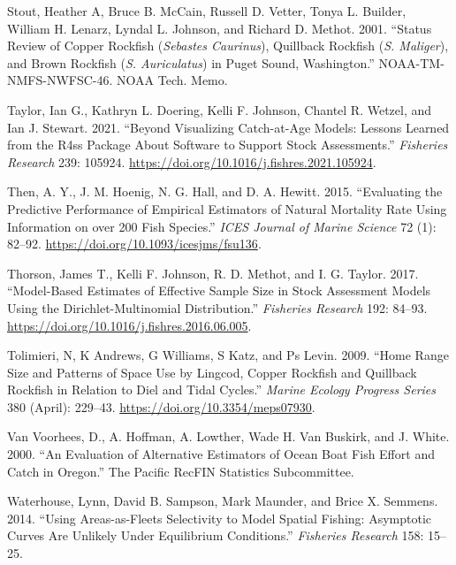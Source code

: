 \documentclass[11pt,
  english,
  a4paper,
]{article}
\begin{document}
\leavevmode\hypertarget{ref-Stoutetal_DPS_2001}{}%
Stout, Heather A, Bruce B. McCain, Russell D. Vetter, Tonya L. Builder, William H. Lenarz, Lyndal L. Johnson, and Richard D. Methot. 2001. ``Status Review of Copper Rockfish (\emph{Sebastes Caurinus}), Quillback Rockfish (\emph{S. Maliger}), and Brown Rockfish (\emph{S. Auriculatus}) in Puget Sound, Washington.'' NOAA-TM-NMFS-NWFSC-46. NOAA Tech. Memo.

\leavevmode\hypertarget{ref-r4ss_2021}{}%
Taylor, Ian G., Kathryn L. Doering, Kelli F. Johnson, Chantel R. Wetzel, and Ian J. Stewart. 2021. ``Beyond Visualizing Catch-at-Age Models: Lessons Learned from the R4ss Package About Software to Support Stock Assessments.'' \emph{Fisheries Research} 239: 105924. \url{https://doi.org/10.1016/j.fishres.2021.105924}.

\leavevmode\hypertarget{ref-then_evaluating_2015-1}{}%
Then, A. Y., J. M. Hoenig, N. G. Hall, and D. A. Hewitt. 2015. ``Evaluating the Predictive Performance of Empirical Estimators of Natural Mortality Rate Using Information on over 200 Fish Species.'' \emph{ICES Journal of Marine Science} 72 (1): 82--92. \url{https://doi.org/10.1093/icesjms/fsu136}.

\leavevmode\hypertarget{ref-thorson_model-based_2017}{}%
Thorson, James T., Kelli F. Johnson, R. D. Methot, and I. G. Taylor. 2017. ``Model-Based Estimates of Effective Sample Size in Stock Assessment Models Using the Dirichlet-Multinomial Distribution.'' \emph{Fisheries Research} 192: 84--93. \url{https://doi.org/10.1016/j.fishres.2016.06.005}.

\leavevmode\hypertarget{ref-tolimieri_home_2009}{}%
Tolimieri, N, K Andrews, G Williams, S Katz, and Ps Levin. 2009. ``Home Range Size and Patterns of Space Use by Lingcod, Copper Rockfish and Quillback Rockfish in Relation to Diel and Tidal Cycles.'' \emph{Marine Ecology Progress Series} 380 (April): 229--43. \url{https://doi.org/10.3354/meps07930}.

\leavevmode\hypertarget{ref-van_voorhees_evaluation_2000}{}%
Van Voorhees, D., A. Hoffman, A. Lowther, Wade H. Van Buskirk, and J. White. 2000. ``An Evaluation of Alternative Estimators of Ocean Boat Fish Effort and Catch in Oregon.'' The Pacific RecFIN Statistics Subcommittee.

\leavevmode\hypertarget{ref-Waterhouseetal_spatialSelex_2014}{}%
Waterhouse, Lynn, David B. Sampson, Mark Maunder, and Brice X. Semmens. 2014. ``Using Areas-as-Fleets Selectivity to Model Spatial Fishing: Asymptotic Curves Are Unlikely Under Equilibrium Conditions.'' \emph{Fisheries Research} 158: 15--25.
\end{document}
